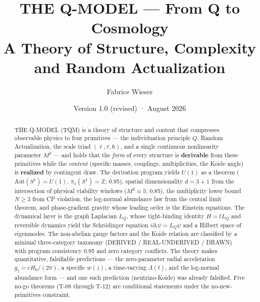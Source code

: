 \documentclass[11pt,a4paper]{article}
\title{\bfseries THE Q-MODEL — From Q to Cosmology\\[2mm]
\large A Theory of Structure, Complexity and Random Actualization}
\author{Fabrice Wieser}
\date{Version 1.0 (revised) \quad·\quad 15 August 2026}
\begin{document}
\maketitle

\begin{center}
\end{center}

\vspace{2mm}

\begin{abstract}
\noindent
THE Q-MODEL (TQM) is a theory of structure and content that compresses observable physics
to four primitives — the individuation principle $Q$, Random Actualization, the scale
triad $(\ell,\tau,\hbar)$, and a single continuous nonlinearity parameter $M^2$ — and
holds that the \emph{form} of every structure is \textbf{derivable} from these primitives
while the \emph{content} (specific masses, couplings, multiplicities, the Koide angle) is
\textbf{realized} by contingent draw. The derivation program yields $U(1)$ as a theorem
($\mathrm{Aut}(S^1)=U(1)$, $\pi_1(S^1)=\mathbb{Z}$; 0.95), spatial dimensionality
$d=3{+}1$ from the intersection of physical viability windows ($M^2\approx5$; 0.85), the
multiplicity lower bound $N\ge3$ from CP violation, the log-normal abundance law from the
central limit theorem, and phase-gradient gravity whose leading order is the Einstein
equations. The dynamical layer is the graph Laplacian $L_Q$, whose tight-binding identity
$H=tL_Q$ and reversible dynamics yield the Schr\"odinger equation
$i\partial_t\psi=L_Q\psi$ and a Hilbert space of eigenmodes. The non-abelian gauge factors
and the Koide relation are classified by a minimal three-category taxonomy
(DERIVED / REAL-UNDERIVED / DRAWN) with program consistency 0.95 and zero category
conflicts. The theory makes quantitative, falsifiable predictions — the zero-parameter
radial acceleration $g_\dagger=cH_0/(2\pi)$, a specific $w(z)$, a time-varying
$\Lambda(t)$, and the log-normal abundance form — and one such prediction (neutrino-Koide)
was already falsified. Five no-go theorems (T-08 through T-12) are conditional statements
under the no-new-primitives constraint.
\end{abstract}
\end{document}
